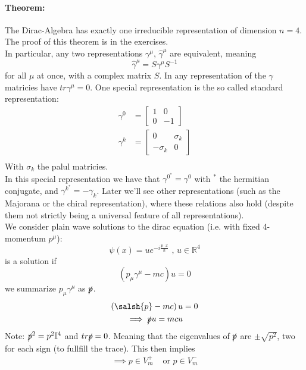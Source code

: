\documentclass{report}
\begin{document}
\paragraph{Theorem:} The Dirac-Algebra has exactly one irreducible representation of dimension $n = 4$. The proof of this theorem is in the exercises.\\
In particular, any two representations $\gamma^\mu$, $\hat{\gamma}^\mu$ are equivalent, meaning  \[
\hat{\gamma}^\mu = S \gamma^\mu S^{-1}
\] for all $ \mu $ at once, with a complex matrix $S$.
In any representation of the $\gamma$ matricies have $tr \gamma^\mu = 0$. One special representation is the so called standard representation: 
\begin{align*}
  \gamma^0 &= \begin{bmatrix} 1 & 0 \\ 0 & -1 \end{bmatrix}  \\
  \gamma^k &= \begin{bmatrix} 0 & \sigma_k \\ -\sigma_k & 0 \end{bmatrix}  \\
\end{align*}
With $\sigma_k$ the palul matricies.\\
In this special representation we have that $\gamma^0^* = \gamma^0$ with $^*$ the hermitian conjugate, and $\gamma^k^* = - \gamma_k$. Later we'll see other representations (such as the Majorana or the chiral representation), where these relations also hold (despite them not strictly being a universal feature of all representations).\\
We consider plain wave solutions to the dirac equation (i.e. with fixed 4-momentum $p^\mu$): \[
  \psi\left( x \right) =  u e^{-i \frac{p \cdot x}{\hbar}} \text{  ,  } u \in \mathbb{R}^{4}
\] is a solution if \[
\left( p_\mu \gamma^\mu - mc \right) u = 0
\] we summarize $p_\mu \gamma^\mu $ as $\slashed{p}$. 
\begin{align*}
  \left( \salsh{p} - mc \right) u &= 0\\
  \implies \slashed{p} u = mcu
\end{align*}
Note: $\slashed{p}^2 = p^2 \mathbb{I}^{4}$ and $tr \slashed{p} = 0$. Meaning that the eigenvalues of $\slashed{p}$ are $\pm \sqrt{p^2} $, two for each sign (to fullfill the trace). This then implies
\begin{align*}
  \implies p  \in V_m^+ &\text{ or } p  \in V_m^- \\
\end{align*}
\end{document}
